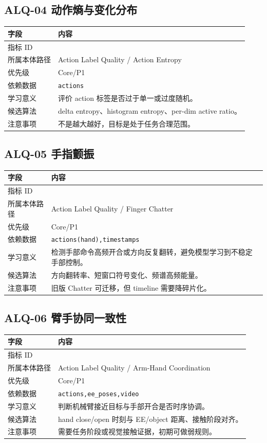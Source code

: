\documentclass[UTF8,zihao=-4,oneside,openany]{ctexrep}
\newcommand{\Code}[1]{\texttt{#1}}
\newcommand{\MID}[1]{\texttt{\seqsplit{#1}}}
\begin{document}
\subsection{ALQ-04 动作熵与变化分布}

\begin{longtable}{L{3.6cm} L{9.6cm}}
\toprule
字段 & 内容 \\
\midrule
指标 ID & \MID{ALQ-04} \\
所属本体路径 & Action Label Quality / Action Entropy \\
优先级 & Core/P1 \\
依赖数据 & \Code{actions} \\
学习意义 & 评价 action 标签是否过于单一或过度随机。 \\
候选算法 & delta entropy、histogram entropy、per-dim active ratio。 \\
注意事项 & 不是越大越好，目标是处于任务合理范围。 \\
\bottomrule
\end{longtable}

\subsection{ALQ-05 手指颤振}

\begin{longtable}{L{3.6cm} L{9.6cm}}
\toprule
字段 & 内容 \\
\midrule
指标 ID & \MID{ALQ-05} \\
所属本体路径 & Action Label Quality / Finger Chatter \\
优先级 & Core/P1 \\
依赖数据 & \Code{actions(hand),timestamps} \\
学习意义 & 检测手部命令高频开合或方向反复翻转，避免模型学习到不稳定手部控制。 \\
候选算法 & 方向翻转率、短窗口符号变化、频谱高频能量。 \\
注意事项 & 旧版 Chatter 可迁移，但 timeline 需要降碎片化。 \\
\bottomrule
\end{longtable}

\subsection{ALQ-06 臂手协同一致性}

\begin{longtable}{L{3.6cm} L{9.6cm}}
\toprule
字段 & 内容 \\
\midrule
指标 ID & \MID{ALQ-06} \\
所属本体路径 & Action Label Quality / Arm-Hand Coordination \\
优先级 & Core/P1 \\
依赖数据 & \Code{actions,ee\_poses,video} \\
学习意义 & 判断机械臂接近目标与手部开合是否时序协调。 \\
候选算法 & hand close/open 时刻与 EE/object 距离、接触阶段对齐。 \\
注意事项 & 需要任务阶段或视觉接触证据，初期可做弱规则。 \\
\bottomrule
\end{longtable}
\end{document}
